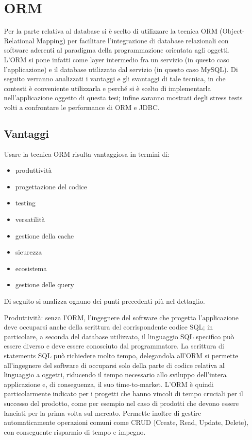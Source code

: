 \chapter{ORM}

Per la parte relativa al database si è scelto di utilizzare la tecnica ORM (Object-Relational Mapping) per facilitare l'integrazione di database relazionali con software aderenti al paradigma della programmazione orientata agli oggetti. L'ORM si pone infatti come layer intermedio fra un servizio (in questo caso l'applicazione) e il database utilizzato dal servizio (in questo caso MySQL). Di seguito verranno analizzati i vantaggi e gli svantaggi di tale tecnica, in che contesti è conveniente utilizzarla e perché si è scelto di implementarla nell'applicazione oggetto di questa tesi; infine saranno mostrati degli stress tests volti a confrontare le performance di ORM e JDBC.

\section{Vantaggi}

Usare la tecnica ORM risulta vantaggiosa in termini di:

\begin{itemize}
  \item produttività
  \item progettazione del codice
  \item testing
  \item versatilità
  \item gestione della cache 
  \item sicurezza
  \item ecosistema
  \item gestione delle query
\end{itemize}

Di seguito si analizza ognuno dei punti precedenti più nel dettaglio.

Produttività: senza l'ORM, l'ingegnere del software che progetta l'applicazione deve occuparsi anche della scrittura del corrispondente codice SQL; in particolare, a seconda del database utilizzato, il linguaggio SQL specifico può essere diverso e deve essere conosciuto dal programmatore. La scrittura di statements SQL può richiedere molto tempo, delegandola all'ORM si permette all'ingegnere del software di occuparsi solo della parte di codice relativa al linguaggio a oggetti, riducendo il tempo necessario allo sviluppo dell'intera applicazione e, di conseguenza, il suo time-to-market. L'ORM è quindi particolarmente indicato per i progetti che hanno vincoli di tempo cruciali per il successo del prodotto, come per esempio nel caso di prodotti che devono essere lanciati per la prima volta sul mercato. Permette inoltre di gestire automaticamente operazioni comuni come CRUD (Create, Read, Update, Delete), con conseguente risparmio di tempo e impegno. 

